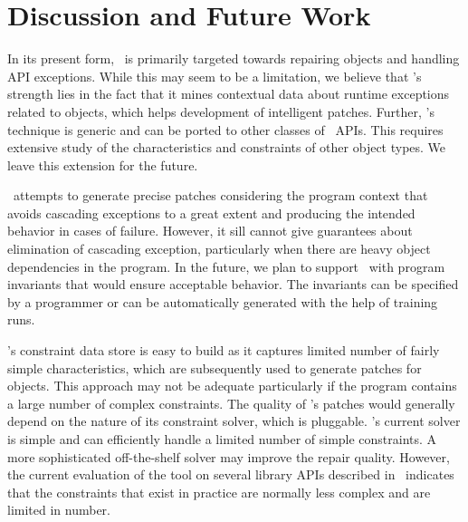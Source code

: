\section{Discussion and Future Work}
\label{sec:discussion}


\begin{mylist}
 
 \item {} In its present form, \tool\ is
primarily targeted towards repairing  objects and handling API
exceptions. While this may seem to be a limitation, we believe that \tool{}'s
strength lies in the fact that it mines contextual data about runtime exceptions
related to  objects, which helps development of intelligent
patches. Further, \tool{}'s technique is generic and can be ported to other
classes of \java\ APIs. This requires extensive study of the characteristics
and constraints of other object types. We leave this extension for the future.

 \item {} \tool\ attempts to generate precise
patches considering the program context that avoids cascading exceptions to a
great extent and producing the intended behavior in cases of failure. However,
it sill cannot give guarantees about elimination of cascading exception,
particularly when there are heavy object dependencies in the program. In the
future, we plan to support \tool\ with program invariants that would ensure
acceptable behavior. The invariants can be specified by a programmer or can be
automatically generated with the help of training runs. 

 \item {} \tool{}'s constraint data
store is easy to build as it captures limited number of fairly simple
 characteristics, which are subsequently used to generate patches
for  objects. This approach may not be adequate particularly if the
program contains a large number of complex constraints. The quality of \tool{}'s
patches would generally depend on the nature of its constraint solver, which is
pluggable. \tool{}'s current solver is simple and can efficiently handle a
limited number of simple constraints. A more sophisticated off-the-shelf solver
may improve the repair quality. However, the current evaluation of the tool on
several library APIs described in~ indicates that the
constraints that exist in practice are normally less complex and are limited in
number.

\end{mylist}
